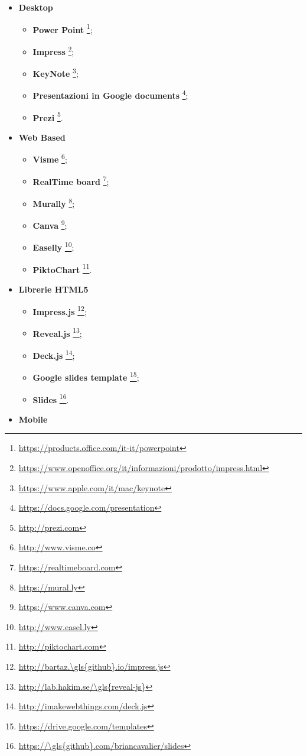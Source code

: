 \begin{itemize}
	\item \textbf{Desktop}
  	\begin{itemize}
  		\item \textbf{Power Point}
  		\footnote{\url{https://products.office.com/it-it/powerpoint}};
  		\item \textbf{Impress}
  		\footnote{\url{https://www.openoffice.org/it/informazioni/prodotto/impress.html}};
  		\item \textbf{KeyNote}
  		\footnote{\url{https://www.apple.com/it/mac/keynote}};
  		\item \textbf{Presentazioni in Google documents}
  		\footnote{\url{https://docs.google.com/presentation}};
  		\item \textbf{Prezi}
  		\footnote{\url{http://prezi.com}}.
  	\end{itemize}
  	\item \textbf{Web Based}
  	\begin{itemize}
  		\item \textbf{Visme}
  		\footnote{\url{http://www.visme.co}};
  		\item \textbf{RealTime board}
  		\footnote{\url{https://realtimeboard.com}};
  		\item \textbf{Murally}
  		\footnote{\url{https://mural.ly}};
  		\item \textbf{Canva}
  		\footnote{\url{https://www.canva.com}};
  		\item \textbf{Easelly}
  		\footnote{\url{http://www.easel.ly}};
  		\item \textbf{PiktoChart}
  		\footnote{\url{http://piktochart.com}}.
  	\end{itemize}
  	  	\item \textbf{Librerie \gls{HTML5}}
  	\begin{itemize}
  		\item \textbf{Impress.js}
  		\footnote{\url{http://bartaz.\gls{github}.io/impress.js}};
  		\item \textbf{\gls{Reveal.js}}
  		\footnote{\url{http://lab.hakim.se/\gls{reveal-js}}};
  		\item \textbf{Deck.js}
  		\footnote{\url{http://imakewebthings.com/deck.js}};
  		\item \textbf{Google slides \gls{template}}
  		\footnote{\url{https://drive.google.com/templates}};
  		\item \textbf{Slides}
  		\footnote{\url{https://\gls{github}.com/briancavalier/slides}}.
  	\end{itemize}
  	  	\item \textbf{Mobile}

\end{itemize}
